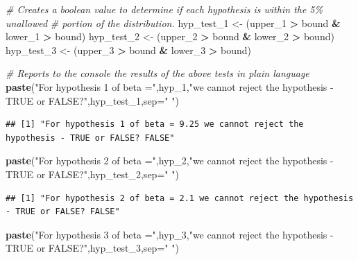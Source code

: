 \documentclass[
]{article}
\newenvironment{Shaded}{\begin{snugshade}}{\end{snugshade}}
\newcommand{\AttributeTok}[1]{\textcolor[rgb]{0.13,0.29,0.53}{#1}}
\newcommand{\CommentTok}[1]{\textcolor[rgb]{0.56,0.35,0.01}{\textit{#1}}}
\newcommand{\FunctionTok}[1]{\textcolor[rgb]{0.13,0.29,0.53}{\textbf{#1}}}
\newcommand{\NormalTok}[1]{#1}
\newcommand{\OtherTok}[1]{\textcolor[rgb]{0.56,0.35,0.01}{#1}}
\newcommand{\SpecialCharTok}[1]{\textcolor[rgb]{0.81,0.36,0.00}{\textbf{#1}}}
\newcommand{\StringTok}[1]{\textcolor[rgb]{0.31,0.60,0.02}{#1}}
\begin{document}
\begin{Shaded}
\begin{Highlighting}[]
\CommentTok{\# Creates a boolean value to determine if each hypothesis is within the 5\% unallowed}
\CommentTok{\# portion of the distribution. }
\NormalTok{hyp\_test\_1 }\OtherTok{\textless{}{-}}\NormalTok{ (upper\_1 }\SpecialCharTok{\textgreater{}}\NormalTok{ bound }\SpecialCharTok{\&}\NormalTok{ lower\_1 }\SpecialCharTok{\textgreater{}}\NormalTok{ bound)}
\NormalTok{hyp\_test\_2 }\OtherTok{\textless{}{-}}\NormalTok{ (upper\_2 }\SpecialCharTok{\textgreater{}}\NormalTok{ bound }\SpecialCharTok{\&}\NormalTok{ lower\_2 }\SpecialCharTok{\textgreater{}}\NormalTok{ bound)}
\NormalTok{hyp\_test\_3 }\OtherTok{\textless{}{-}}\NormalTok{ (upper\_3 }\SpecialCharTok{\textgreater{}}\NormalTok{ bound }\SpecialCharTok{\&}\NormalTok{ lower\_3 }\SpecialCharTok{\textgreater{}}\NormalTok{ bound)}

\CommentTok{\# Reports to the console the results of the above tests in plain language}
\FunctionTok{paste}\NormalTok{(}\StringTok{"For hypothesis 1 of beta ="}\NormalTok{,hyp\_1,}\StringTok{"we cannot reject the hypothesis {-} TRUE or FALSE?"}\NormalTok{,hyp\_test\_1,}\AttributeTok{sep=}\StringTok{" "}\NormalTok{)}
\end{Highlighting}
\end{Shaded}

\begin{verbatim}
## [1] "For hypothesis 1 of beta = 9.25 we cannot reject the hypothesis - TRUE or FALSE? FALSE"
\end{verbatim}

\begin{Shaded}
\begin{Highlighting}[]
\FunctionTok{paste}\NormalTok{(}\StringTok{"For hypothesis 2 of beta ="}\NormalTok{,hyp\_2,}\StringTok{"we cannot reject the hypothesis {-} TRUE or FALSE?"}\NormalTok{,hyp\_test\_2,}\AttributeTok{sep=}\StringTok{" "}\NormalTok{)}
\end{Highlighting}
\end{Shaded}

\begin{verbatim}
## [1] "For hypothesis 2 of beta = 2.1 we cannot reject the hypothesis - TRUE or FALSE? FALSE"
\end{verbatim}

\begin{Shaded}
\begin{Highlighting}[]
\FunctionTok{paste}\NormalTok{(}\StringTok{"For hypothesis 3 of beta ="}\NormalTok{,hyp\_3,}\StringTok{"we cannot reject the hypothesis {-} TRUE or FALSE?"}\NormalTok{,hyp\_test\_3,}\AttributeTok{sep=}\StringTok{" "}\NormalTok{)}
\end{Highlighting}
\end{Shaded}
\end{document}
